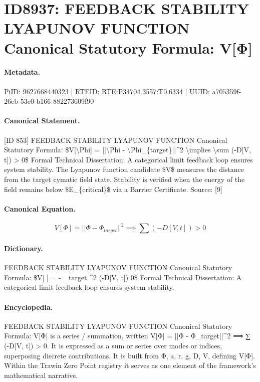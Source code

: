 \section*{ID8937: FEEDBACK STABILITY LYAPUNOV FUNCTION Canonical Statutory Formula: V[Φ]}
\paragraph{Metadata.}
PiID: 9627668440323 | RTEID: RTE:P34704.3557:T0.6334 | UUID: a705359f-26cb-53c0-b166-882273609f90

\paragraph{Canonical Statement.}
[ID 853] FEEDBACK STABILITY LYAPUNOV FUNCTION Canonical Statutory Formula: \$V[\textbackslash{}Phi] = ||\textbackslash{}Phi - \textbackslash{}Phi\_\{target\}||\textasciicircum{}2 \textbackslash{}implies \textbackslash{}sum (-D[V, t]) > 0\$ Formal Technical Dissertation: A categorical limit feedback loop ensures system stability. The Lyapunov function candidate \$V\$ measures the distance from the target cymatic field state. Stability is verified when the energy of the field remains below \$E\_\{critical\}\$ via a Barrier Certificate. Source: [9]

\paragraph{Canonical Equation.}
\[
V[\Phi] = ||\Phi - \Phi_{target}||^2 \implies \sum (-D[V, t]) > 0
\]

\paragraph{Dictionary.}
FEEDBACK STABILITY LYAPUNOV FUNCTION Canonical Statutory Formula: \$V[ ] = - \_target \textasciicircum{}2 (-D[V, t]) 0\$ Formal Technical Dissertation: A categorical limit feedback loop ensures system stability.

\paragraph{Encyclopedia.}
FEEDBACK STABILITY LYAPUNOV FUNCTION Canonical Statutory Formula: V[Φ] is a series / summation, written V[Φ] = ||Φ - Φ\_target||\textasciicircum{}2 ⟹ ∑ (-D[V, t]) > 0. It is expressed as a sum or series over modes or indices, superposing discrete contributions. It is built from Φ, a, r, g, D, V, defining V[Φ]. Within the Trawin Zero Point registry it serves as one element of the framework's mathematical narrative.
